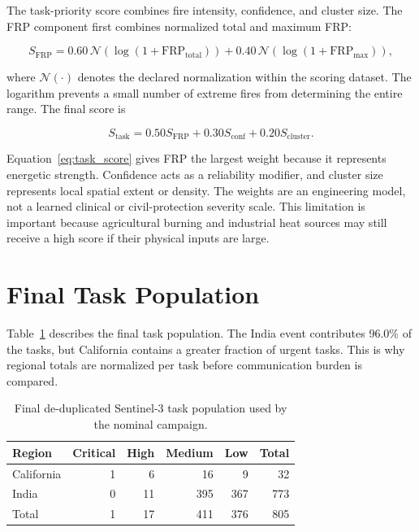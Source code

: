 The task-priority score combines fire intensity, confidence, and cluster size. The FRP component first combines normalized total and maximum FRP:

\begin{equation}
S_{\mathrm{FRP}} = 0.60\,\mathcal{N}\!\left(\log(1+\mathrm{FRP}_{\mathrm{total}})\right)
+0.40\,\mathcal{N}\!\left(\log(1+\mathrm{FRP}_{\mathrm{max}})\right),
\label{eq:frp_score}
\end{equation}

where $\mathcal{N}(\cdot)$ denotes the declared normalization within the scoring dataset. The logarithm prevents a small number of extreme fires from determining the entire range. The final score is

\begin{equation}
S_{\mathrm{task}} = 0.50S_{\mathrm{FRP}}+0.30S_{\mathrm{conf}}+0.20S_{\mathrm{cluster}}.
\label{eq:task_score}
\end{equation}

Equation~\ref{eq:task_score} gives FRP the largest weight because it represents energetic strength. Confidence acts as a reliability modifier, and cluster size represents local spatial extent or density. The weights are an engineering model, not a learned clinical or civil-protection severity scale. This limitation is important because agricultural burning and industrial heat sources may still receive a high score if their physical inputs are large.

\section{Final Task Population}

Table~\ref{tab:task_population} describes the final task population. The India event contributes 96.0\% of the tasks, but California contains a greater fraction of urgent tasks. This is why regional totals are normalized per task before communication burden is compared.

\begin{table}[htbp]
\centering
\caption{Final de-duplicated Sentinel-3 task population used by the nominal campaign.}
\label{tab:task_population}
\begin{tabular}{lrrrrr}
\toprule
Region & Critical & High & Medium & Low & Total \\
\midrule
California & 1 & 6 & 16 & 9 & 32 \\
India & 0 & 11 & 395 & 367 & 773 \\
\midrule
Total & 1 & 17 & 411 & 376 & 805 \\
\bottomrule
\end{tabular}
\end{table}

